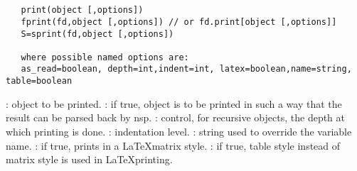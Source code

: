 

\begin{mandesc}
  \\
  \\
\end{mandesc}
\label{print}
\begin{calling_sequence}
\begin{verbatim}
   print(object [,options])
   fprint(fd,object [,options]) // or fd.print[object [,options]]
   S=sprint(fd,object [,options]) 

   where possible named options are: 
   as_read=boolean, depth=int,indent=int, latex=boolean,name=string, table=boolean
\end{verbatim}
\end{calling_sequence}

\begin{parameters}
  \begin{varlist}
    : object to be printed.
    : if true, object is to be printed in such a way that the result can be 
    parsed back by nsp.
    : control, for recursive objects, the depth at which printing
    is done.
    : indentation level.
    : string used to override the variable name.
    : if true, prints in a \LaTeX matrix style.
    : if true, table style instead of matrix style is used in \LaTeX printing.
  \end{varlist}
\end{parameters}

